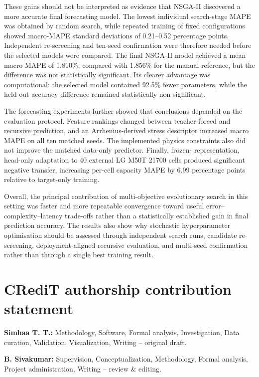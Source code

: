 \documentclass[a4paper,fleqn]{cas-sc}
\begin{document}
These gains should not be interpreted as evidence that NSGA-II discovered a
more accurate final forecasting model. The lowest individual search-stage
MAPE was obtained by random search, while repeated training of fixed
configurations showed macro-MAPE standard deviations of 0.21--0.52 percentage
points. Independent re-screening and ten-seed confirmation were therefore
needed before the selected models were compared. The final NSGA-II model
achieved a mean macro MAPE of 1.810\%, compared with 1.856\% for the manual
reference, but the difference was not statistically significant. Its clearer
advantage was computational: the selected model contained 92.5\% fewer
parameters, while the held-out accuracy difference remained statistically
non-significant.

The forecasting experiments further showed that conclusions depended on the
evaluation protocol. Feature rankings changed between teacher-forced and
recursive prediction, and an Arrhenius-derived stress descriptor increased
macro MAPE on all ten matched seeds. The implemented physics constraints also
did not improve the matched data-only predictor. Finally, frozen-
representation, head-only adaptation to 40 external LG M50T 21700 cells
produced significant negative transfer, increasing per-cell capacity MAPE by
6.99 percentage points relative to target-only training.

Overall, the principal contribution of multi-objective evolutionary search in
this setting was faster and more repeatable convergence toward useful
error--complexity--latency trade-offs rather than a statistically established
gain in final prediction accuracy. The results also show why stochastic
hyperparameter optimisation should be assessed through independent search
runs, candidate re-screening, deployment-aligned recursive evaluation, and
multi-seed confirmation rather than through a single best training result.

\section*{CRediT authorship contribution statement}

\textbf{Simhaa T. T.:}
Methodology, Software, Formal analysis, Investigation, Data curation,
Validation, Visualization, Writing -- original draft.

\textbf{B. Sivakumar:}
Supervision, Conceptualization, Methodology, Formal analysis,
Project administration, Writing -- review \& editing.
\end{document}
